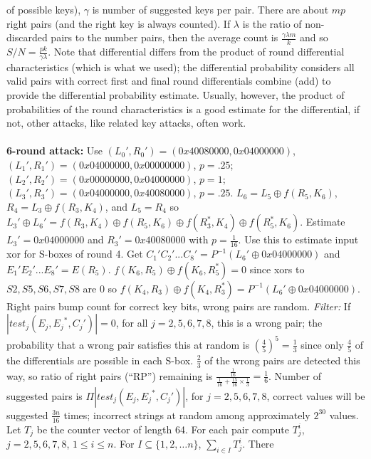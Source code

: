 of possible keys),
$\gamma$ is number of suggested keys per pair.  There are about $mp$ right pairs (and
the right key is always counted).  If
$\lambda$ is the ratio of non-discarded pairs to the number pairs, then the average
count is ${\frac {\gamma \lambda m} {k}}$ and so $S/N= {\frac {pk} {\gamma \lambda}}$.
Note that differential differs from the product of round differential characteristics (which
is what we used); the differential probability considers
all valid pairs with correct first and final round differentials combine (add) to provide
the differential probability estimate.  
Usually, however, the product of probabilities of the round characteristics
is a good estimate for the differential, if not, other attacks, like related
key attacks, often work.
\\
\\
{\bf 6-round attack:}  Use
$(L_0 ' , R_0 ')= (0x40080000, 0x04000000)$,
$(L_1 ' , R_1 ')= (0x04000000, 0x00000000)$, $p= .25$;
$(L_2 ' , R_2 ')= ( 0x00000000, 0x04000000)$, $p= 1$;
$(L_3 ' , R_3 ') = (0x04000000, 0x40080000)$, $p= .25$.
$L_6 = L_5 \oplus f(R_5, K_6 )$, $R_4 = L_3 \oplus f(R_3, K_4 )$, and $L_5= R_4$ so
$L_3 ' \oplus L_6 ' = f(R_3, K_4 ) \oplus f(R_5, K_6 ) \oplus f(R_3^*, K_4 ) \oplus f(R_5^*, K_6 )$.  
Estimate $L_3 ' = 0x04000000$ and $R_3 ' = 0x40080000$ with $p= {\frac 1 {16}}$.  
Use this to estimate input xor for S-boxes of round 4.  
Get $C_1 ' C_2 ' ... C_8 ' = P^{-1} (L_6 ' \oplus 0x04000000)$ and
$E_1 ' E_2 ' ... E_8 ' = E(R_5 )$.  
$f(K_6, R_5) \oplus f(K_6, R_5^*) = 0$ since xors to $S2, S5, S6, S7, S8 $ are $0$
so $f(K_4, R_3) \oplus f(K_4,R_3^*)= P^{-1} (L_6 ' \oplus 0x04000000)$.
Right pairs bump count for correct key bits, wrong pairs are random.  
\emph{Filter:}   If $|test_j (E_j , {E_j}^*, C_j ' )| = 0 $, for all  $j= 2,5,6,7,8$, this is a
wrong pair; the probability that a wrong pair satisfies this at random is 
$({\frac {4}{5}})^5 = {\frac 1 3}$ since only ${\frac 4 5}$ of the differentials are possible
in each S-box.  
${\frac 2 3}$ of the wrong pairs are detected this way, so
ratio of right pairs (``RP'') remaining is ${\frac {\frac 1 {16}} {{\frac 1 {16}} +
{\frac {15} {16}} \times {\frac 1 3}}}= {\frac 1 6}$.
Number of suggested pairs is
$\Pi |test_j (E_j , {E_j}^*, C_j ' )| $, for $j= 2,5,6,7,8$, correct values
will be suggested ${\frac {3n} {16}}$ times; incorrect strings at random
among approximately $2^{30}$ values.  Let $T_j$ be the counter vector of length 64.
For each pair compute $T^i_j$, $j= 2,5,6,7,8$, $1 \leq i \leq n$.  For
$I \subseteq \{ 1, 2, \ldots n \}$, $\sum_{i \in I} T^i_j$.  There
